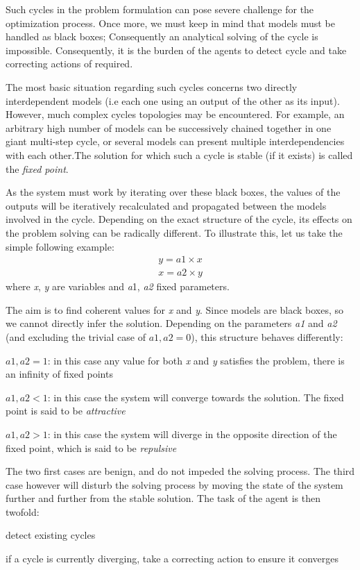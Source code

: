 Such cycles in the problem formulation can pose severe challenge for the optimization process. Once more, we must keep in mind that models must be handled as black boxes; Consequently an analytical solving of the cycle is impossible. Consequently, it is the burden of the agents to detect cycle and take correcting actions of required.

The most basic situation regarding such cycles concerns two directly interdependent models (i.e each one using an output of the other as its input). However, much complex cycles topologies may be encountered. For example, an arbitrary high number of models can be successively chained together in one giant multi-step cycle, or several models can present multiple interdependencies with each other.The solution for which such a cycle is stable (if it exists) is called the \emph{fixed point}.

As the system must work by iterating over these black boxes, the values of the outputs will be iteratively recalculated and propagated between the models involved in the cycle. Depending on the exact structure of the cycle, its effects on the problem solving can be radically different. To illustrate this, let us take the simple following example:
\begin{gather*}
y = a1 \times x \\
x = a2 \times y
\end{gather*}
where \emph{x}, \emph{y} are variables and \emph{a}1, \emph{a2} fixed parameters.
 
The aim is to find coherent values for \emph{x} and \emph{y}. Since models are black boxes, so we cannot directly infer the solution. Depending on the parameters \emph{a1} and \emph{a2} (and excluding the trivial case of \(a1, a2 = 0\)), this structure behaves differently: 
 
\begin{compactitem}
\item \(a1, a2 = 1\): in this case any value for both \emph{x} and \emph{y} satisfies the problem, there is an infinity of fixed points
\item \(a1, a2 < 1\): in this case the system will converge towards the solution. The fixed point is said to be \emph{attractive}
\item \(a1, a2 > 1\): in this case the system will diverge in the opposite direction of the fixed point, which is said to be \emph{repulsive}
\end{compactitem}

The two first cases are benign, and do not impeded the solving process. The third case however will disturb the solving process by moving the state of the system further and further from the stable solution. The task of the agent is then twofold:
\begin{compactenum}
\item detect existing cycles
\item if a cycle is currently diverging, take a correcting action to ensure it converges
\end{compactenum}

